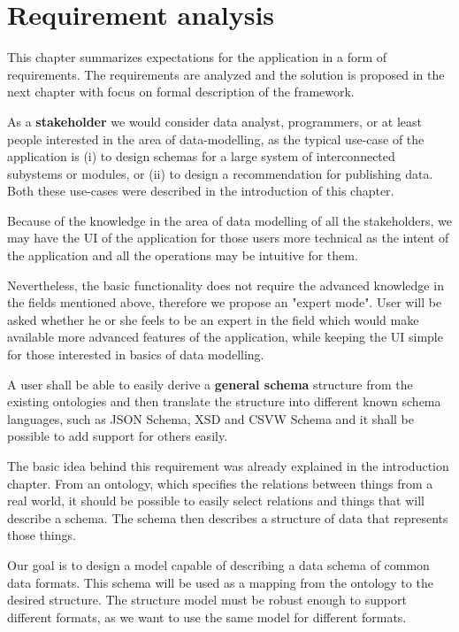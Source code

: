 \chapter{Requirement analysis}\label{chapters:analysis}

This chapter summarizes expectations for the application in a form of requirements. The requirements are analyzed and the solution is proposed in the next chapter with focus on formal description of the framework.

\bigskip

As a \textbf{stakeholder} we would consider data analyst, programmers, or at least people interested in the area of data-modelling, as the typical use-case of the application is (i) to design schemas for a large system of interconnected subystems or modules, or (ii) to design a recommendation for publishing data. Both these use-cases were described in the introduction of this chapter.

Because of the knowledge in the area of data modelling of all the stakeholders, we may have the UI of the application for those users more technical as the intent of the application and all the operations may be intuitive for them.

Nevertheless, the basic functionality does not require the advanced knowledge in the fields mentioned above, therefore we propose an "expert mode". User will be asked whether he or she feels to be an expert in the field which would make available more advanced features of the application, while keeping the UI simple for those interested in basics of data modelling.

\bigskip

\begin{requirement}
A user shall be able to easily derive a \textbf{general schema} structure from the existing ontologies and then translate the structure into different known schema languages, such as JSON Schema, XSD and CSVW Schema and it shall be possible to add support for others easily.
\end{requirement}

The basic idea behind this requirement was already explained in the introduction chapter. From an ontology, which specifies the relations between things from a real world, it should be possible to easily select relations and things that will describe a schema. The schema then describes a structure of data that represents those things.

\smallskip

Our goal is to design a model capable of describing a data schema of common data formats. This schema will be used as a mapping from the ontology to the desired structure. The structure model must be robust enough to support different formats, as we want to use the same model for different formats.

